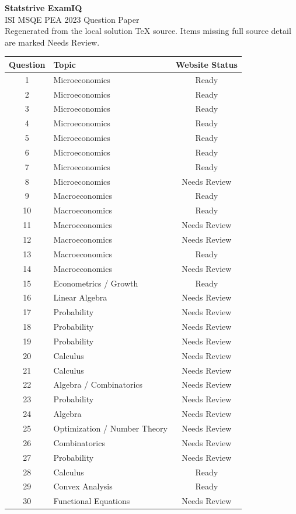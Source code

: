 \documentclass[11pt]{article}
\begin{document}
\begin{center}
{\Huge \textbf{Statstrive ExamIQ}}\\[6pt]
{\Large ISI MSQE PEA 2023 Question Paper}\\[4pt]
{\small Regenerated from the local solution TeX source. Items missing full source detail are marked Needs Review.}
\end{center}

\vspace{0.5cm}
\begin{longtable}{c l c}
\toprule
Question & Topic & Website Status \\
\midrule
\endhead
1 & Microeconomics & Ready \\
2 & Microeconomics & Ready \\
3 & Microeconomics & Ready \\
4 & Microeconomics & Ready \\
5 & Microeconomics & Ready \\
6 & Microeconomics & Ready \\
7 & Microeconomics & Ready \\
8 & Microeconomics & Needs Review \\
9 & Macroeconomics & Ready \\
10 & Macroeconomics & Ready \\
11 & Macroeconomics & Needs Review \\
12 & Macroeconomics & Needs Review \\
13 & Macroeconomics & Ready \\
14 & Macroeconomics & Needs Review \\
15 & Econometrics / Growth & Ready \\
16 & Linear Algebra & Needs Review \\
17 & Probability & Needs Review \\
18 & Probability & Needs Review \\
19 & Probability & Needs Review \\
20 & Calculus & Needs Review \\
21 & Calculus & Needs Review \\
22 & Algebra / Combinatorics & Needs Review \\
23 & Probability & Needs Review \\
24 & Algebra & Needs Review \\
25 & Optimization / Number Theory & Needs Review \\
26 & Combinatorics & Needs Review \\
27 & Probability & Needs Review \\
28 & Calculus & Ready \\
29 & Convex Analysis & Ready \\
30 & Functional Equations & Needs Review \\
\bottomrule
\end{longtable}
\end{document}
